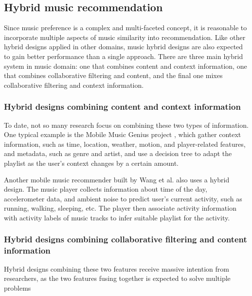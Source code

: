 \subsection{Hybrid music recommendation}
Since music preference is a complex and multi-faceted concept, it is reasonable to incorporate multiple aspects of music similarity into recommendation. Like other hybrid designs applied in other domains, music hybrid designs are also expected to gain better performance than a single approach. There are three main hybrid system in music domain: one that combines content and context information, one that combines collaborative filtering and content, and the final one mixes collaborative filtering and context information. 

\subsubsection{Hybrid designs combining content and context information}
To date, not so many research focus on combining these two types of information. One typical example is the Mobile Music Genius project \cite{schedl2013ameliorating}, which gather context information, such as time, location, weather, motion, and player-related features, and metadata, such as genre and artist, and use a decision tree to adapt the playlist as the user's context changes by a certain amount. 

Another mobile music recommender built by Wang et al. \cite{wang2012context} also uses a hybrid design. The music player collects information about time of the day, accelerometer data, and ambient noise to predict user's current activity, such as running, walking, sleeping, etc. The player then associate activity information with activity labels of music tracks to infer suitable playlist for the activity. 

\subsubsection{Hybrid designs combining collaborative filtering and content information}
Hybrid designs combining these two features receive massive intention from researchers, as the two features fusing together is expected to solve multiple problems \cite{burke2002hybrid} \cite{burke2007adaptive} \cite{aoscar2010music}

